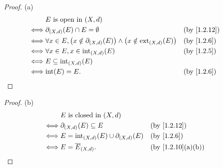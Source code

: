 \begin{proof}{(a)}
  \begin{align*}
         & E \text{ is open in } (X, d)                                                                                                            \\
    \iff & \partial_{(X, d)}(E) \cap E = \emptyset                                                                  &  & \text{(by \cref{1.2.12})} \\
    \iff & \forall x \in E, \big(x \notin \partial_{(X, d)}(E)\big) \land \big(x \notin \text{ext}_{(X, d)}(E)\big) &  & \text{(by \cref{1.2.6})}  \\
    \iff & \forall x \in E, x \in \text{int}_{(X, d)}(E)                                                            &  & \text{(by \cref{1.2.5})}  \\
    \iff & E \subseteq \text{int}_{(X, d)}(E)                                                                                                      \\
    \iff & \text{int}(E) = E.                                                                                       &  & \text{(by \cref{1.2.6})}
  \end{align*}
\end{proof}

\begin{proof}{(b)}
  \begin{align*}
         & E \text{ is closed in } (X, d)                                                            \\
    \iff & \partial_{(X, d)}(E) \subseteq E                     &  & \text{(by \cref{1.2.12})}       \\
    \iff & E = \text{int}_{(X, d)}(E) \cup \partial_{(X, d)}(E) &  & \text{(by \cref{1.2.6})}        \\
    \iff & E = \overline{E}_{(X, d)}.                           &  & \text{(by \cref{1.2.10}(a)(b))}
  \end{align*}
\end{proof}

